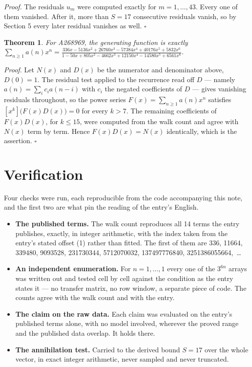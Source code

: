 \documentclass[11pt]{article}
\newtheorem{theorem}{Theorem}
\theoremstyle{definition}
\begin{document}
{\itshape Proof.} The residuals $u_m$ were computed exactly for $m = 1,\dots,43$. Every one of them vanished. After it, more than $S = 17$ consecutive residuals vanish, so by Section 5 every later residual vanishes as well. $\square$

\begin{theorem} For A268969, the generating function is exactly $\sum_{n\ge 1} a(n)x^n = \frac{336x - 5136x^{2} + 26760x^{3} - 57384x^{4} + 40176x^{5} + 5832x^{6}}{1 - 50x + 805x^{2} - 4662x^{3} + 12150x^{4} - 14580x^{5} + 6561x^{6}}$.\end{theorem}

{\itshape Proof.} Let $N(x)$ and $D(x)$ be the numerator and denominator above, $D(0)=1$. The residual test applied to the recurrence read off $D$ --- namely $a(n) = \sum_i c_i a(n-i)$ with $c_i$ the negated coefficients of $D$ --- gives vanishing residuals throughout, so the power series $F(x)=\sum_{n\ge 1}a(n)x^n$ satisfies $[x^k]\bigl(F(x)D(x)\bigr) = 0$ for every $k > 7$. The remaining coefficients of $F(x)D(x)$, for $k \le 15$, were computed from the walk count and agree with $N(x)$ term by term. Hence $F(x)D(x) = N(x)$ identically, which is the assertion. $\square$

\section{Verification}

Four checks were run, each reproducible from the code accompanying this note, and the first two are what pin the reading of the entry's English.

\begin{itemize}

\item {\bfseries The published terms.} The walk count reproduces all 14 terms the entry publishes, exactly, in integer arithmetic, with the index taken from the entry's stated offset (1) rather than fitted. The first of them are 336, 11664, 339480, 9093528, 231730344, 5712070032, 137497776840, 3251386055664,~\dots

\item {\bfseries An independent enumeration.} For $n = 1,\dots,1$ every one of the $3^{6n}$ arrays was written out and tested cell by cell against the condition as the entry states it --- no transfer matrix, no row window, a separate piece of code. The counts agree with the walk count and with the entry.

\item {\bfseries The claim on the raw data.} Each claim was evaluated on the entry's published terms alone, with no model involved, wherever the proved range and the published data overlap. It holds there.

\item {\bfseries The annihilation test.} Carried to the derived bound $S = 17$ over the whole vector, in exact integer arithmetic, never sampled and never truncated.

\end{itemize}
\end{document}
